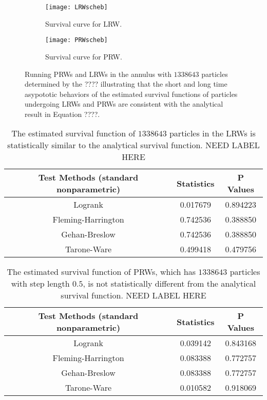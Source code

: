 \begin{figure}
  \begin{subfigure}{0.9\textwidth}
    \centering
    \texttt{[image: LRWscheb]}
    \caption{Survival curve for LRW.\label{fig:LRW_survival}}
  \end{subfigure}
  \begin{subfigure}{0.9\textwidth}
    \centering
    \texttt{[image: PRWscheb]}
    \caption{Survival curve for PRW.\label{fig:PRW_survival}}
  \end{subfigure}
  \caption{Running PRWs and LRWs in the annulus with $1338643$
    particles determined by the ???? illustrating
    that the short and long time asypototic behaviors of the estimated
    survival functions of particles undergoing LRWs and PRWs
    are consistent with the analytical result in Equation ????.}
\end{figure}

\begin{table}
  \centering
  \begin{tabular}{|c|c|c|}\hline
    Test Methods (standard nonparametric) & Statistics & P Values \\
    \hline
    Logrank & 0.017679 & 0.894223 \\
    \hline
    Fleming-Harrington & 0.742536 & 0.388850 \\
    \hline
    Gehan-Breslow & 0.742536 & 0.388850 \\
    \hline
    Tarone-Ware & 0.499418 & 0.479756 \\
    \hline
  \end{tabular}
  \caption{The estimated survival function of $1338643$ particles in
    the LRWs is statistically similar to the analytical survival
    function. NEED LABEL HERE}
\end{table}

\begin{table}
  \centering
  \begin{tabular}{|c|c|c|}\hline
    Test Methods (standard nonparametric) & Statistics & P Values \\
    \hline
    Logrank & 0.039142 & 0.843168 \\
    \hline
    Fleming-Harrington & 0.083388 & 0.772757 \\
    \hline
    Gehan-Breslow & 0.083388 & 0.772757 \\
    \hline
    Tarone-Ware & 0.010582 & 0.918069 \\
    \hline
  \end{tabular}
  \caption{The estimated survival function of PRWs, which has
    $1338643$ particles with step length $0.5$, is not statistically
    different from the analytical survival function. NEED LABEL HERE}
\end{table}

